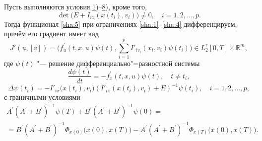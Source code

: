 \smallskip

\hypertarget{sha:th:3)}{}
\begin{theorem}[3]Пусть выполняются условия {\rm \hyperlink{sha:1)}{1})--\hyperlink{sha:8)}{8}),}   кроме того{\rm ,} $$\det\bigl(E+I_{ix}(x(t_{i}),v_{i})\bigr)\ne 0, \quad i=1, 2, \dots, p.$$ 
Тогда функционал \eqref{sha:5} при ограничениях \eqref{sha:1}--\eqref{sha:4} дифференцируем{\rm ,} причём его градиент имеет вид
\begin{equation} \label{sha:43} 
J'(u,[v])=\biggl(f_{u}^{\prime}(t,x,u)\psi(t), \sum_{i=1}^{p}I'_{iv_{i}}(x_{i},v_{i})\psi(t_{i}) \biggr)\in L_{2}^{r}[0, T]\times \mathbb R^{m},
\end{equation} 
где $\psi(t)$ "--- решение дифференциально"=разностной системы
\begin{equation} \label{sha:44} 
\frac{d\psi(t)}{dt}=-f_{x}^{\prime}(t,x,u)\psi(t),  \quad      t\ne t_{i},
\end{equation} 
\begin{equation} \label{sha:45} 
\Delta \psi(t_{i})=-I'_{ix}\bigl(x(t_{i}),v_{i}\bigr)(I'_{ix}(x(t_{i}),v_i)+E)^{-1}\psi(t_{i}), \quad     i=1, 2, \dots, p, 
\end{equation} 
с граничными условиями
\begin{multline} \label{sha:46} 
A^{\prime}(A^{\prime}+B^{\prime})^{-1}\psi(T)+B^{\prime}(A^{\prime}+B^{\prime})^{-1}\psi(0)= 
\\
=B^{\prime}(A^{\prime}+B^{\prime})^{-1}\Phi_{x(0)}\bigl(x(0),x(T)\bigr)-A^{\prime}(A^{\prime}+B^{\prime})^{-1}\Phi_{x(T)}\bigl(x(0),x (T)\bigr). 
\end{multline}
\end{theorem}
 
\smallskip 
 
